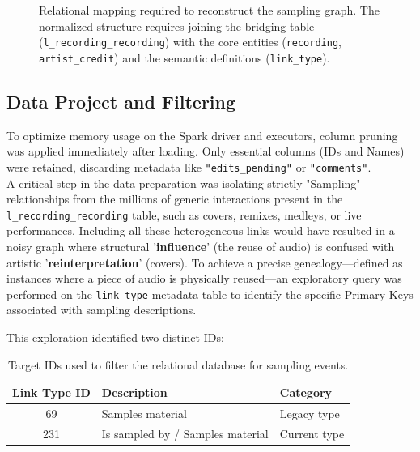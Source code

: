 \documentclass[a4paper, 12pt]{article}
\begin{document}
\begin{figure}[H]
    \caption{Relational mapping required to reconstruct the sampling graph. The normalized structure requires joining the bridging table (\texttt{l\_recording\_recording}) with the core entities (\texttt{recording}, \texttt{artist\_credit}) and the semantic definitions (\texttt{link\_type}).}
    \label{fig:er_diagram}
\end{figure}

\subsection{Data Project and Filtering}
To optimize memory usage on the Spark driver and executors, column pruning was applied immediately after loading. Only essential columns (IDs and Names) were retained, discarding metadata like \texttt{"edits\_pending"} or \texttt{"comments"}.
\\
A critical step in the data preparation was isolating strictly "Sampling" relationships from the millions of generic interactions present in the \texttt{l\_recording\_recording} table, such as covers, remixes, medleys, or live performances. Including all these heterogeneous links would have resulted in a noisy graph where structural '\textbf{influence}' (the reuse of audio) is confused with artistic '\textbf{reinterpretation}' (covers).
To achieve a precise genealogy—defined as instances where a piece of audio is physically reused—an exploratory query was performed on the \texttt{link\_type} metadata table to identify the specific Primary Keys associated with sampling descriptions.

This exploration identified two distinct IDs:

\begin{table}[H]
    \centering
    \begin{tabular}{cll}
    \toprule
    \textbf{Link Type ID} & \textbf{Description} & \textbf{Category} \\
    \midrule
    69 & Samples material & Legacy type \\
    231 & Is sampled by / Samples material & Current type \\
    \bottomrule
    \end{tabular}
    \caption{Target IDs used to filter the relational database for sampling events.}
    \label{tab:link_type_ids}
\end{table}
\end{document}
